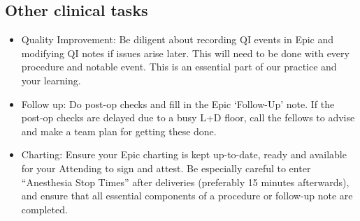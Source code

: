 \documentclass[twoside,8pt]{extarticle}
\providecommand{\tightlist}{%
}
\begin{document}
\subsection{Other clinical tasks}\label{other-clinical-tasks-3}

\begin{itemize}
\tightlist
\item
  Quality Improvement: Be diligent about recording QI events in Epic and
  modifying QI notes if issues arise later. This will need to be done
  with every procedure and notable event. This is an essential part of
  our practice and your learning.
\item
  Follow up: Do post-op checks and fill in the Epic `Follow-Up' note. If
  the post-op checks are delayed due to a busy L+D floor, call the
  fellows to advise and make a team plan for getting these done.
\item
  Charting: Ensure your Epic charting is kept up-to-date, ready and
  available for your Attending to sign and attest. Be especially careful
  to enter ``Anesthesia Stop Times'' after deliveries (preferably 15
  minutes afterwards), and ensure that all essential components of a
  procedure or follow-up note are completed.
\end{itemize}

\end{document}
